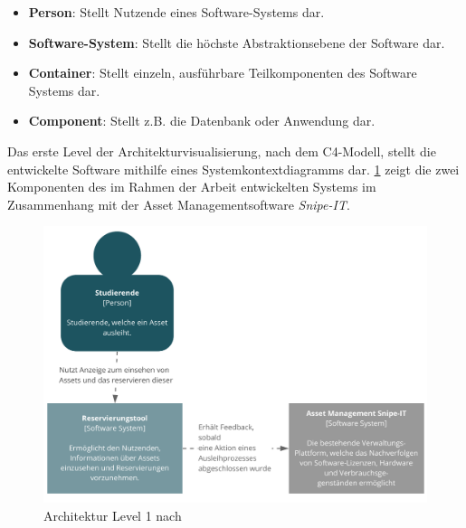 \begin{itemize}
    \item \textbf{Person}: Stellt Nutzende eines Software-Systems dar.
    \item \textbf{Software-System}: Stellt die höchste Abstraktionsebene der Software dar.
    \item \textbf{Container}: Stellt einzeln, ausführbare Teilkomponenten des Software Systems dar. 
    \item \textbf{Component}: Stellt z.B. die Datenbank oder Anwendung dar.
\end{itemize}

{\sffamily\color{maincolor}{Level 1: Context}} 

Das erste Level der Architekturvisualisierung, nach dem C4-Modell, stellt die entwickelte Software
mithilfe eines Systemkontextdiagramms dar. \ref{fig:level1} zeigt die zwei Komponenten des im Rahmen
der Arbeit entwickelten Systems im Zusammenhang mit der Asset Managementsoftware \textit{Snipe-IT}.

\begin{figure}[h]
    \centering
    \includegraphics[scale=0.4]{Bilder/level1.pdf}
    \caption[Architektur Level 1]{Architektur Level 1 nach }
    \label{fig:level1}
\end{figure}

